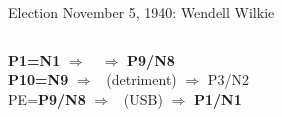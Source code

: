 \begin{frame}[t]{Election November 5, 1940: Wendell Wilkie}
\begin{columns}[T, onlytextwidth]
\textbf{\dgreen P1=N1} 
	$\Rightarrow$ \Saturn\,\Retrograde\, $\Rightarrow$ \textbf{\red P9/N8}\\
\textbf{\red P10=N9}
	$\Rightarrow$ \Venus\, (detriment) $\Rightarrow$ P3/N2\\
PE=\textbf{\red P9/N8}
	 $\Rightarrow$ \Mercury\, (USB) $\Rightarrow$ \textbf{\dgreen P1/N1}



\end{columns}
\end{frame}
